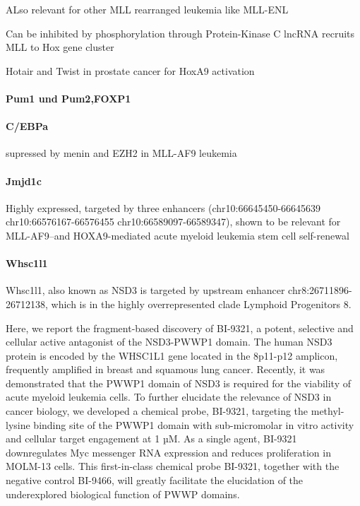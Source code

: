 ALso relevant for other MLL rearranged leukemia like MLL-ENL \cite{Zeisig2004}

Can be inhibited by phosphorylation through Protein-Kinase C \cite{Vijapurkar2004}
lncRNA recruits MLL to Hox gene cluster \cite{Yang2014}

Hotair and Twist in prostate cancer for HoxA9 activation\cite{Malek2017}

\paragraph{Pum1 und Pum2,FOXP1}
\cite{Spassov2003,Naudin2017}

\paragraph{C/EBPa}
supressed by menin and EZH2 \cite{Thiel2013} in MLL-AF9 leukemia

\paragraph{Jmjd1c}
Highly expressed, targeted by three enhancers (chr10:66645450-66645639
chr10:66576167-66576455 chr10:66589097-66589347), shown to be relevant for MLL-AF9--and HOXA9-mediated acute myeloid leukemia stem cell self-renewal\cite{Zhu2016a} 

\paragraph{Whsc1l1}
Whsc1l1, also known as NSD3 \cite{Shen2015} is targeted by upstream enhancer chr8:26711896-26712138, which is in the highly overrepresented clade Lymphoid Progenitors 8.   \cite{Boettcher2019}

Here, we report the fragment-based discovery of BI-9321, a potent, selective and cellular active antagonist of the NSD3-PWWP1 domain. The human NSD3 protein is encoded by the WHSC1L1 gene located in the 8p11-p12 amplicon, frequently amplified in breast and squamous lung cancer. Recently, it was demonstrated that the PWWP1 domain of NSD3 is required for the viability of acute myeloid leukemia cells. To further elucidate the relevance of NSD3 in cancer biology, we developed a chemical probe, BI-9321, targeting the methyl-lysine binding site of the PWWP1 domain with sub-micromolar in vitro activity and cellular target engagement at 1 µM. As a single agent, BI-9321 downregulates Myc messenger RNA expression and reduces proliferation in MOLM-13 cells. This first-in-class chemical probe BI-9321, together with the negative control BI-9466, will greatly facilitate the elucidation of the underexplored biological function of PWWP domains.


